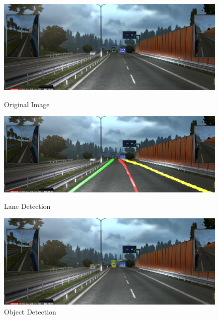 \documentclass[runningheads]{llncs}
\begin{document}
\begin{figure}[!htb]
	\includegraphics[width=\linewidth]{result/w000092.jpg}
	\caption{Original Image}\label{fig:Original_Image}
	\endminipage\hfill
	\includegraphics[width=\linewidth]{result/w000092-lane.jpg}
	\caption{Lane Detection}\label{fig:Lane_Line_Result}
	\endminipage\hfill
	\includegraphics[width=\linewidth]{result/w000092-obj.jpg}
	\caption{Object Detection}\label{fig:Object_result}
	\endminipage
\end{figure}
\end{document}
